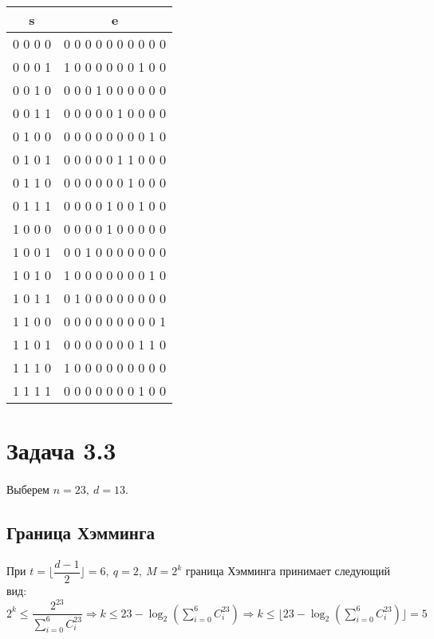 \documentclass[fontsize=14pt]{article}
\begin{document}
\begin{center}
\begin{tabular}{ |c|c| } 
\hline
s & e\\
\hline\hline 
0 0 0 0 & 0 0 0 0 0 0 0 0 0 0\\
\hline
0 0 0 1 & 1 0 0 0 0 0 0 1 0 0\\
\hline
0 0 1 0 & 0 0 0 1 0 0 0 0 0 0\\ 
\hline
0 0 1 1 & 0 0 0 0 0 1 0 0 0 0\\ 
\hline
0 1 0 0 & 0 0 0 0 0 0 0 0 1 0\\ 
\hline
0 1 0 1 & 0 0 0 0 0 1 1 0 0 0\\ 
\hline
0 1 1 0 & 0 0 0 0 0 0 1 0 0 0\\ 
\hline
0 1 1 1 & 0 0 0 0 1 0 0 1 0 0\\ 
\hline
1 0 0 0 & 0 0 0 0 1 0 0 0 0 0\\ 
\hline
1 0 0 1 & 0 0 1 0 0 0 0 0 0 0\\
\hline
1 0 1 0 & 1 0 0 0 0 0 0 0 1 0\\ 
\hline
1 0 1 1 & 0 1 0 0 0 0 0 0 0 0\\ 
\hline
1 1 0 0 & 0 0 0 0 0 0 0 0 0 1\\ 
\hline
1 1 0 1 & 0 0 0 0 0 0 0 1 1 0\\ 
\hline
1 1 1 0 & 1 0 0 0 0 0 0 0 0 0\\ 
\hline
1 1 1 1 & 0 0 0 0 0 0 0 1 0 0\\
\hline
\end{tabular}
\end{center}

\section*{Задача 3.3}

\paragraph*{}
Выберем $n = 23,\ d = 13$.

\subsection*{Граница Хэмминга}

\paragraph*{}
При $t = \lfloor \dfrac{d - 1}{2} \rfloor = 6,\ q = 2,\ M = 2^k$ граница Хэмминга принимает следующий вид: $2^k \leq \dfrac{2^{23}}{\sum\limits_{i = 0}^6 C_i^{23}}
\Rightarrow
k \leq 23 - \log_2 \left( \sum\limits_{i = 0}^6 C_i^{23} \right)
\Rightarrow
k \leq \lfloor 23 - \log_2 \left( \sum\limits_{i = 0}^6 C_i^{23} \right) \rfloor = 5
$
\end{document}
